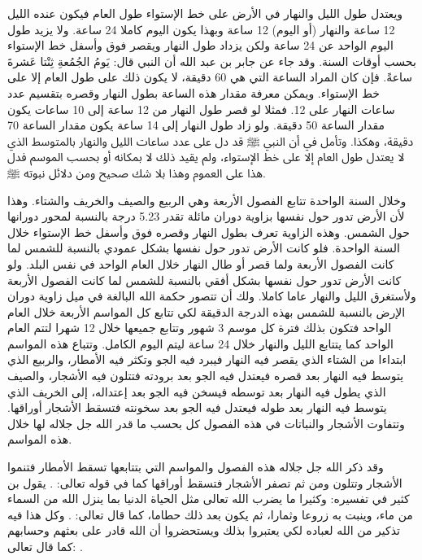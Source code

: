 ويعتدل طول الليل والنهار في الأرض على خط الإستواء طول العام فيكون عنده الليل 12 ساعة والنهار (أو اليوم) 12 ساعة وبهذا يكون اليوم كاملا 24 ساعة. ولا يزيد طول اليوم الواحد عن 24 ساعة ولكن يزداد طول النهار ويقصر فوق وأسفل خط الإستواء بحسب أوقات السنة. وقد جاء عن جابر بن عبد الله أن النبي قال: يَومُ الجُمُعةِ ثِنْتا عَشرةَ ساعةً. فإن كان المراد الساعة التي هي 60 دقيقة، لا يكون ذلك على طول العام إلا على خط الإستواء. ويمكن معرفة مقدار هذه الساعة بطول النهار وقصره بتقسيم عدد ساعات النهار على 12. فمثلا لو قصر طول النهار من 12 ساعة إلى 10 ساعات يكون مقدار الساعة 50 دقيقة. ولو زاد طول النهار إلى 14 ساعة يكون مقدار الساعة 70 دقيقة، وهكذا. وتأمل في أن النبي ﷺ  قد دل على عدد ساعات الليل والنهار بالمتوسط الذي لا يعتدل طول العام إلا على خط الإستواء، ولم يقيد ذلك لا بمكانه أو بحسب الموسم فدل هذا على العموم وهذا بلا شك صحيح ومن دلائل نبوته ﷺ.

وخلال السنة الواحدة تتابع الفصول الأربعة وهي الربيع والصيف والخريف والشتاء. وهذا لأن الأرض تدور حول نفسها بزاوية دوران مائلة تقدر 5.23 درجة بالنسبة لمحور دورانها حول الشمس. وهذه الزاوية تعرف بطول النهار وقصره فوق وأسفل خط الإستواء خلال السنة الواحدة. فلو كانت الأرض تدور حول نفسها بشكل عمودي بالنسبة للشمس لما كانت الفصول الأربعة ولما قصر أو طال النهار خلال العام الواحد في نفس البلد. ولو كانت الأرض تدور حول نفسها بشكل أفقي بالنسبة للشمس لما كانت الفصول الأربعة ولأستغرق الليل والنهار عاما كاملا. ولك أن تتصور حكمة الله البالغة في ميل زاوية دوران الإرض بالنسبة للشمس بهذه الدرجة الدقيقة لكي تتابع كل المواسم الأربعة خلال العام الواحد فتكون بذلك فترة كل موسم 3 شهور وتتابع جميعها خلال 12 شهرا لتتم العام الواحد كما يتتابع الليل والنهار خلال 24 ساعة ليتم اليوم الكامل. وتتباع هذه المواسم ابتداءا من الشتاء الذي يقصر فيه النهار فيبرد فيه الجو وتكثر فيه الأمطار، والربيع الذي يتوسط فيه النهار بعد قصره فيعتدل فيه الجو بعد برودته فتتلون فيه الأشجار، والصيف الذي يطول فيه النهار بعد توسطه فيسخن فيه الجو بعد إعتداله، إلى الخريف الذي يتوسط فيه النهار بعد طوله فيعتدل فيه الجو بعد سخونته فتسقط الأشجار أوراقها. وتتفاوت الأشجار والنباتات في هذه الفصول كل بحسب ما قدر الله جل جلاله لها خلال هذه المواسم. 

وقد ذكر الله جل جلاله هذه الفصول والمواسم التي بتتابعها تسقط الأمطار فتنموا الأشجار وتتلون ومن ثم تصفر الأشجار فتسقط أوراقها كما في قوله تعالى: \quranayah*[39][21]{\footnotesize \surahname*[39]}. يقول بن كثير في تفسيره: وكثيرا ما يضرب الله تعالى مثل الحياة الدنيا بما ينزل الله من السماء من ماء، وينبت به زروعا وثمارا، ثم يكون بعد ذلك حطاما، كما قال تعالى: \quranayah*[18][45]{\footnotesize \surahname*[18]} \href{https://shamela.ws/book/8473/3591#p4}{\faExternalLink} \cite{tafsir_ibnKathir}. وكل هذا فيه تذكير من الله لعباده لكي يعتبروا بذلك ويستحضروا أن الله قادر على بعثهم وحسابهم كما قال تعالى: \quranayah*[30][50]{\footnotesize \surahname*[9]}.


